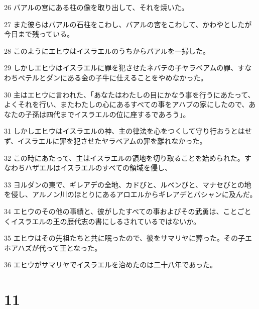 \par 26 バアルの宮にある柱の像を取り出して、それを焼いた。
\par 27 また彼らはバアルの石柱をこわし、バアルの宮をこわして、かわやとしたが今日まで残っている。
\par 28 このようにエヒウはイスラエルのうちからバアルを一掃した。
\par 29 しかしエヒウはイスラエルに罪を犯させたネバテの子ヤラベアムの罪、すなわちベテルとダンにある金の子牛に仕えることをやめなかった。
\par 30 主はエヒウに言われた、「あなたはわたしの目にかなう事を行うにあたって、よくそれを行い、またわたしの心にあるすべての事をアハブの家にしたので、あなたの子孫は四代までイスラエルの位に座するであろう」。
\par 31 しかしエヒウはイスラエルの神、主の律法を心をつくして守り行おうとはせず、イスラエルに罪を犯させたヤラベアムの罪を離れなかった。
\par 32 この時にあたって、主はイスラエルの領地を切り取ることを始められた。すなわちハザエルはイスラエルのすべての領域を侵し、
\par 33 ヨルダンの東で、ギレアデの全地、カドびと、ルベンびと、マナセびとの地を侵し、アルノン川のほとりにあるアロエルからギレアデとバシャンに及んだ。
\par 34 エヒウのその他の事績と、彼がしたすべての事およびその武勇は、ことごとくイスラエルの王の歴代志の書にしるされているではないか。
\par 35 エヒウはその先祖たちと共に眠ったので、彼をサマリヤに葬った。その子エホアハズが代って王となった。
\par 36 エヒウがサマリヤでイスラエルを治めたのは二十八年であった。

\chapter{11}

